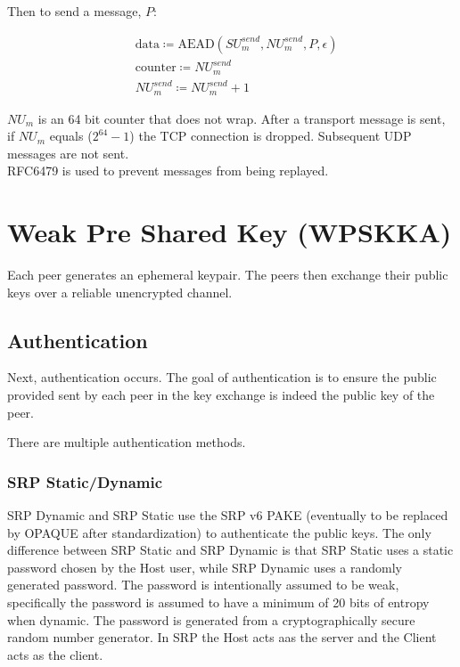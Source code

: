 \documentclass{article}
\begin{document}
    Then to send a message, $P$:

    \begin{align*}
        & \text{data} \coloneqq \text{AEAD}(\mathit{SU}_{m}^{send}, \mathit{NU}_{m}^{send}, P, \epsilon)\\
        & \text{counter} \coloneqq \mathit{NU}_{m}^{send}\\
        & \mathit{NU}_{m}^{send} \coloneqq \mathit{NU}_{m}^{send} + 1
    \end{align*}


    $\mathit{NU}_{m}$ is an 64 bit counter that does not wrap.
    After a transport message is sent, if $\mathit{NU}_{m}$ equals
    ($2^{64}-1$) the TCP connection is dropped.
    Subsequent UDP messages are not sent.\\

    RFC6479 is used to prevent messages from being replayed.

    \section{Weak Pre Shared Key (WPSKKA)}

    Each peer generates an ephemeral keypair.
    The peers then exchange their public keys over a reliable unencrypted channel.


    \subsection{Authentication}

    Next, authentication occurs.
    The goal of authentication is to ensure the public provided sent by each peer in the key exchange is indeed the
    public key of the peer.

    There are multiple authentication methods.

    \subsubsection{SRP Static/Dynamic}

    SRP Dynamic and SRP Static use the SRP v6 PAKE (eventually to be replaced by OPAQUE after standardization)
    to authenticate the public keys.
    The only difference between SRP Static and SRP Dynamic is that SRP Static uses a static password chosen by the
    Host user, while SRP Dynamic uses a randomly generated password.
    The password is intentionally assumed to be weak, specifically the password is assumed to have a minimum of 20
    bits of entropy when dynamic.
    The password is generated from a cryptographically secure random number generator.
    In SRP the Host acts aas the server and the Client acts as the client.
\end{document}
